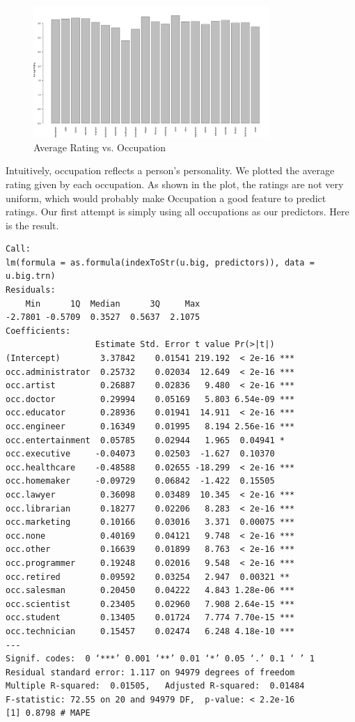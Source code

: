 \documentclass[11pt]{article}
\begin{document}
\begin{figure}[ht!]
\begin{center}
\includegraphics[width=0.8\textwidth]{ratingxocc.png}
\caption{Average Rating vs. Occupation}
\end{center}
\end{figure}

Intuitively, occupation reflects a person's personality. We plotted 
the average rating given by each occupation. As shown in the plot, 
the ratings are not very uniform, which would probably make 
Occupation a good feature to predict ratings. 
Our first attempt is simply using all occupations as our 
predictors. Here is the result.
\begin{verbatim}
Call:
lm(formula = as.formula(indexToStr(u.big, predictors)), data = u.big.trn)
Residuals:
    Min      1Q  Median      3Q     Max 
-2.7801 -0.5709  0.3527  0.5637  2.1075 
Coefficients:
                  Estimate Std. Error t value Pr(>|t|)    
(Intercept)        3.37842    0.01541 219.192  < 2e-16 ***
occ.administrator  0.25732    0.02034  12.649  < 2e-16 ***
occ.artist         0.26887    0.02836   9.480  < 2e-16 ***
occ.doctor         0.29994    0.05169   5.803 6.54e-09 ***
occ.educator       0.28936    0.01941  14.911  < 2e-16 ***
occ.engineer       0.16349    0.01995   8.194 2.56e-16 ***
occ.entertainment  0.05785    0.02944   1.965  0.04941 *  
occ.executive     -0.04073    0.02503  -1.627  0.10370    
occ.healthcare    -0.48588    0.02655 -18.299  < 2e-16 ***
occ.homemaker     -0.09729    0.06842  -1.422  0.15505    
occ.lawyer         0.36098    0.03489  10.345  < 2e-16 ***
occ.librarian      0.18277    0.02206   8.283  < 2e-16 ***
occ.marketing      0.10166    0.03016   3.371  0.00075 ***
occ.none           0.40169    0.04121   9.748  < 2e-16 ***
occ.other          0.16639    0.01899   8.763  < 2e-16 ***
occ.programmer     0.19248    0.02016   9.548  < 2e-16 ***
occ.retired        0.09592    0.03254   2.947  0.00321 ** 
occ.salesman       0.20450    0.04222   4.843 1.28e-06 ***
occ.scientist      0.23405    0.02960   7.908 2.64e-15 ***
occ.student        0.13405    0.01724   7.774 7.70e-15 ***
occ.technician     0.15457    0.02474   6.248 4.18e-10 ***
---
Signif. codes:  0 ‘***’ 0.001 ‘**’ 0.01 ‘*’ 0.05 ‘.’ 0.1 ‘ ’ 1
Residual standard error: 1.117 on 94979 degrees of freedom
Multiple R-squared:  0.01505,	Adjusted R-squared:  0.01484 
F-statistic: 72.55 on 20 and 94979 DF,  p-value: < 2.2e-16
[1] 0.8798 # MAPE
\end{verbatim}
\end{document}
